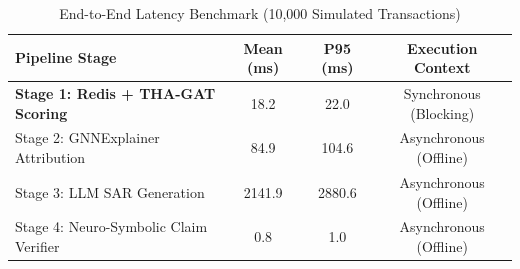 \begin{table}[!t]
\centering
\caption{End-to-End Latency Benchmark (10,000 Simulated Transactions)}
\label{tab:latency}
\begin{tabular}{lccc}
\toprule
\textbf{Pipeline Stage} & \textbf{Mean (ms)} & \textbf{P95 (ms)} & \textbf{Execution Context} \\
\midrule
\textbf{Stage 1: Redis + THA-GAT Scoring} & 18.2 & 22.0 & Synchronous (Blocking) \\
Stage 2: GNNExplainer Attribution & 84.9 & 104.6 & Asynchronous (Offline) \\
Stage 3: LLM SAR Generation & 2141.9 & 2880.6 & Asynchronous (Offline) \\
Stage 4: Neuro-Symbolic Claim Verifier & 0.8 & 1.0 & Asynchronous (Offline) \\
\bottomrule
\end{tabular}
\end{table}
